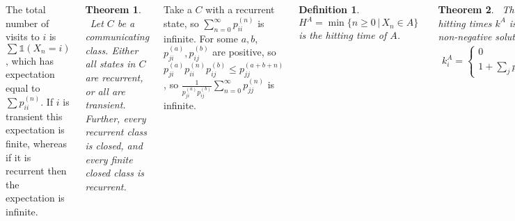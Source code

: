 \documentclass{tikzposter} %
\newtheorem{theorem}{Theorem}
\newtheorem{definition}{Definition}
\begin{document}
\begin{columns}
{{    The total number of visits to $i$ is $\sum \mathds{1}(X_{n} = i)$, which has expectation equal to $\sum p^{(n)}_{ii}$. If $i$ is transient this expectation is finite, whereas if it is recurrent then the expectation is infinite. \\

    \begin{theorem}
    \ Let $C$ be a communicating class. Either all states in $C$ are recurrent, or all are transient. Further, every recurrent class is closed, and every finite closed class is recurrent.
    \end{theorem}
    \hphantom{}

    Take a $C$ with a recurrent state, so $\sum_{n=0}^{\infty} p_{ii}^{(n)}$ is infinite. For some $a, b$, $p_{ji}^{(a)}, p_{ij}^{(b)}$ are positive, so $p_{ji}^{(a)}p_{ii}^{(n)}p_{ij}^{(b)} \le p_{jj}^{(a+b+n)}$, so $\frac{1}{p_{ji}^{(a)}p_{ij}^{(b)}} \sum_{n=0}^{\infty} p_{jj}^{(n)}$ is infinite. \\

  }
  \hphantom{}

  \begin{definition}
  \ $H^{A} = \min \{n \ge 0 \,|\, X_{n} \in A\}$ is the hitting time of $A$.
  \end{definition}
  \hphantom{}

  \begin{theorem}
  \ The vector of mean hitting times $k^{A}$ is the minimal non-negative solution to
    \begin{align*}
      k_{i}^{A} = \begin{cases}
                    0 & \text{if } i \in A \\
                    1 + \sum_{j} p_{ij}k_{j}^{A} & \text{otherwise}
                 \end{cases}
    \end{align*}
  \end{theorem}
  \hphantom{}

  The proof here follows straightforwardly from conditional expectations, and minimality using the same idea as for hitting probabilities. \\

  From this we get the notion of a mean return time, $m_{i} = 1 + \sum_{j} p_{ij}k^{\{i\}}_{j}$. If $i$ is recurrent but $m_{i}$ is infinite, we say that $i$ is null recurrent. If however $m_{i} < \infty$ then $i$ is positive recurrent.
}


\end{columns}
\end{document}

